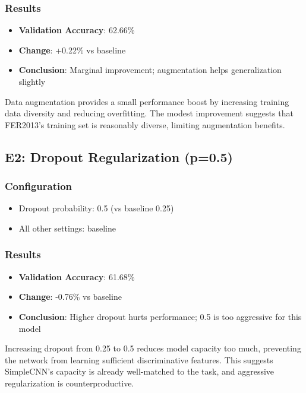 \documentclass[12pt,a4paper]{article}
\begin{document}
\subsubsection{Results}
\begin{itemize}[leftmargin=*]
    \item \textbf{Validation Accuracy}: 62.66\%
    \item \textbf{Change}: +0.22\% vs baseline
    \item \textbf{Conclusion}: Marginal improvement; augmentation helps generalization slightly
\end{itemize}

Data augmentation provides a small performance boost by increasing training data diversity and reducing overfitting. The modest improvement suggests that FER2013's training set is reasonably diverse, limiting augmentation benefits.


\subsection{E2: Dropout Regularization (p=0.5)}

\subsubsection{Configuration}
\begin{itemize}[leftmargin=*]
    \item Dropout probability: 0.5 (vs baseline 0.25)
    \item All other settings: baseline
\end{itemize}

\subsubsection{Results}
\begin{itemize}[leftmargin=*]
    \item \textbf{Validation Accuracy}: 61.68\%
    \item \textbf{Change}: -0.76\% vs baseline
    \item \textbf{Conclusion}: Higher dropout hurts performance; 0.5 is too aggressive for this model
\end{itemize}

Increasing dropout from 0.25 to 0.5 reduces model capacity too much, preventing the network from learning sufficient discriminative features. This suggests SimpleCNN's capacity is already well-matched to the task, and aggressive regularization is counterproductive.
\end{document}
